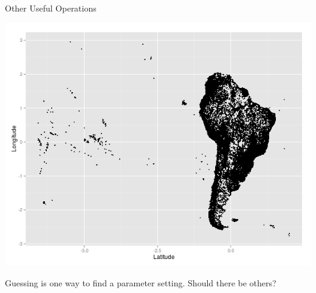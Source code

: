 \documentclass{beamer}
\begin{document}
    \begin{frame}{Other Useful Operations}
    \begin{center}
        \includegraphics[width=\textwidth]{images/south_america.png}
    \end{center}
    Guessing is one way to find a parameter setting. Should there be others?
    \end{frame}
\end{document}
